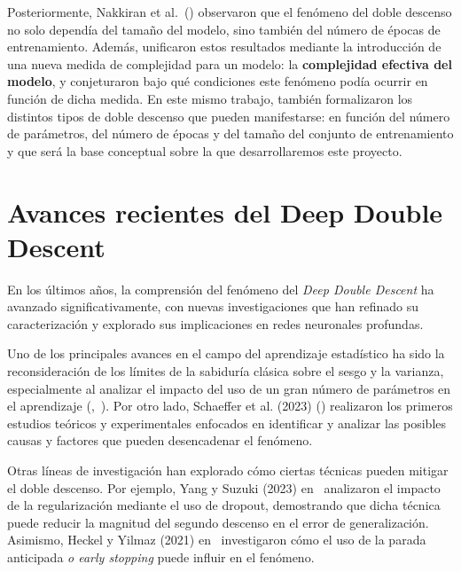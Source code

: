 Posteriormente, Nakkiran et al.\ (\cite{Nakkiran2019}) observaron que el fenómeno del doble descenso no solo dependía del tamaño del modelo, sino también del número de épocas de entrenamiento. Además, unificaron estos resultados mediante la introducción de una nueva medida de complejidad para un modelo: la \textbf{complejidad efectiva del modelo}, y conjeturaron bajo qué condiciones este fenómeno podía ocurrir en función de dicha medida. En este mismo trabajo, también formalizaron los distintos tipos de doble descenso que pueden manifestarse: en función del número de parámetros, del número de épocas y del tamaño del conjunto de entrenamiento y que será la base conceptual sobre la que desarrollaremos este proyecto.\newline

\section{Avances recientes del Deep Double Descent}\label{}

En los últimos años, la comprensión del fenómeno del \textit{Deep Double Descent} ha avanzado significativamente, con nuevas investigaciones que han refinado su caracterización y explorado sus implicaciones en redes neuronales profundas.\newline

Uno de los principales avances en el campo del aprendizaje estadístico ha sido la reconsideración de los límites de la sabiduría clásica sobre el sesgo y la varianza, especialmente al analizar el impacto del uso de un gran número de parámetros en el aprendizaje (\cite{Zhang2021},~\cite{Curth2023}). Por otro lado, Schaeffer et al. (2023) (\cite{Schaeffer2023}) realizaron los primeros estudios teóricos y experimentales enfocados en identificar y analizar las posibles causas y factores que pueden desencadenar el fenómeno.\newline

Otras líneas de investigación han explorado cómo ciertas técnicas pueden mitigar el doble descenso. Por ejemplo, Yang y Suzuki (2023) en~\cite{Yang2024} analizaron el impacto de la regularización mediante el uso de dropout, demostrando que dicha técnica puede reducir la magnitud del segundo descenso en el error de generalización. Asimismo, Heckel y Yilmaz (2021) en~\cite{Heckel2020} investigaron cómo el uso de la parada anticipada \emph{o early stopping} puede influir en el fenómeno.\newline

